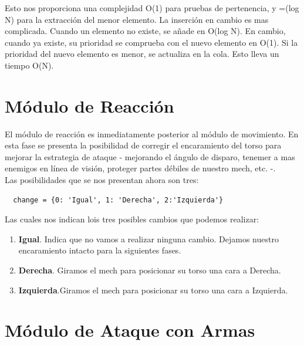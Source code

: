 \documentclass[a4paper,12pt,oneside]{book}
\begin{document}
Esto nos proporciona una complejidad O(1) para pruebas de pertenencia,
y =(log N) para la extracción del menor elemento. La inserción en
cambio es mas complicada. Cuando un elemento no existe, se añade en
O(log N). En cambio, cuando ya existe, su prioridad se comprueba con
el nuevo elemento en O(1). Si la prioridad del nuevo elemento es
menor, se actualiza en la cola. Esto lleva un tiempo O(N).

\section{Módulo de Reacción}

El módulo de reacción es inmediatamente posterior al módulo de
movimiento. En esta fase se presenta la posibilidad de corregir el
encaramiento del torso para mejorar la estrategia de ataque -
mejorando el ángulo de disparo, tenemer a mas enemigos en línea de
visión, proteger partes débiles de nuestro mech, etc. -.\\

Las posibilidades que se nos presentan ahora son tres:
\begin{lstlisting}
  change = {0: 'Igual', 1: 'Derecha', 2:'Izquierda'}
\end{lstlisting}
Las cuales nos indican lois tres posibles cambios que podemos
realizar:
\begin{enumerate}
\item {\bf Igual}. Indica que no vamos a realizar ninguna
  cambio. Dejamos nuestro encaramiento intacto para la siguientes
  fases.
\item {\bf Derecha}. Giramos el mech para posicionar su torso una cara
  a Derecha.
\item {\bf Izquierda}.Giramos el mech para posicionar su torso una cara
  a Izquierda.
\end{enumerate}



\section{Módulo de Ataque con Armas}
\end{document}
